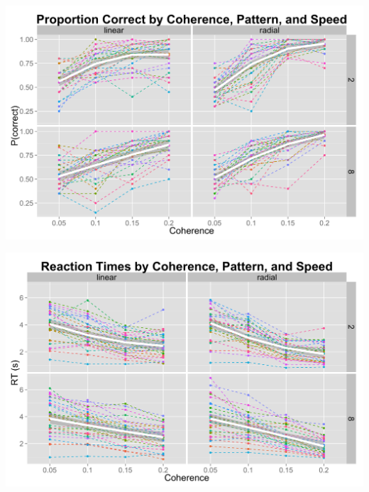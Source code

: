 \documentclass[landscape,final,a0paper,fontscale=0.285]{baposter}
\begin{document}
\begin{poster}
{      \begin{center}
        \includegraphics[scale=0.12]{img/pcorr.png}
     
        \includegraphics[scale=0.12]{img/rt.png}
      \end{center}
    }




\end{poster}
\end{document}

